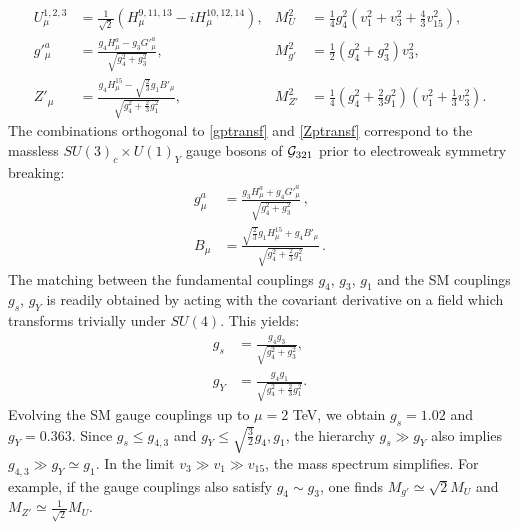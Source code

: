 \begin{align}
  U_\mu^{1,2,3} 
    &= \frac{1}{\sqrt{2}} \left( H^{9,11,13}_\mu \!\!\!- i H^{10,12,14}_\mu \right), 
  &
  M^2_{U} 
    &= \frac{1}{4} g_4^2 \left(v_1^2 + v_3^2 + \frac{4}{3} v_{15}^2\right), \label{defU} \\
  g'^a_\mu 
    &= \frac{g_4 H^a_\mu - g_3 G'^a_\mu}{\sqrt{g_4^2 + g_3^2}},
  &
  M^2_{g'} 
    &= \frac{1}{2}  (g_4^2 + g_3^2) v_3^2,\label{gptransf}\\
  Z'_\mu 
    &= \frac{g_4 H^{15}_\mu - \sqrt{\frac{2}{3}} g_1 B'_\mu}{\sqrt{g_4^2 + \frac{2}{3} g_1^2}},
  &
  M^2_{Z'} 
    &= \frac{1}{4} \left( g_4^2 + \frac{2}{3} g_1^2 \right) \left(v_1^2 + \frac{1}{3} v_3^2 \right). \label{Zptransf}
\end{align}
The combinations orthogonal to \eqref{gptransf} and \eqref{Zptransf}
correspond to the massless $SU(3)_c \times U(1)_Y$ gauge bosons of $\mathcal{G}_{\rm 321}$ 
prior to electroweak symmetry breaking:
\begin{align}
\label{gtransf} 
g^a_\mu &= \frac{g_3 H^a_\mu + g_4 G'^a_\mu}{\sqrt{g_4^2 + g_3^2}} \, , \\
\label{Btransf} 
B_\mu &= \frac{\sqrt{\frac{2}{3}} g_1 H^{15}_\mu + g_4 B'_\mu}{\sqrt{g_4^2 + \frac{2}{3} g_1^2}} \, .
\end{align}
The matching between the fundamental couplings $g_4$, $g_3$, $g_1$ and the SM couplings $g_s$, $g_Y$ is readily obtained by acting with the covariant derivative on a field which transforms trivially under $SU(4)$. This yields:
\begin{align}
\label{matchinggsgs}
g_s &= \frac{g_4 g_3}{\sqrt{g_4^2 + g_3^2}}, 
\\ 
\label{matchinggsgY}
g_Y &= \frac{g_4 g_1}{\sqrt{g_4^2 + \frac{2}{3} g_1^2}}.
\end{align}
Evolving the SM gauge couplings up to $\mu=2$ TeV, we obtain 
$g_s = 1.02$ and $g_Y = 0.363$. 
Since $g_s \leq g_{4,3}$ and $g_Y \leq \sqrt{\tfrac{3}{2}} g_{4}, g_{1}$,  
the hierarchy $g_s \gg g_Y$ also implies $g_{4,3} \gg g_Y \simeq g_1$. 
In the limit $v_3 \gg v_1 \gg v_{15}$, the mass spectrum simplifies. For example, if the gauge couplings also satisfy $g_4 \sim g_3$, one finds $M_{g'} \simeq \sqrt{2} M_U$ and $M_{Z'} \simeq \tfrac{1}{\sqrt{2}} M_U$.


